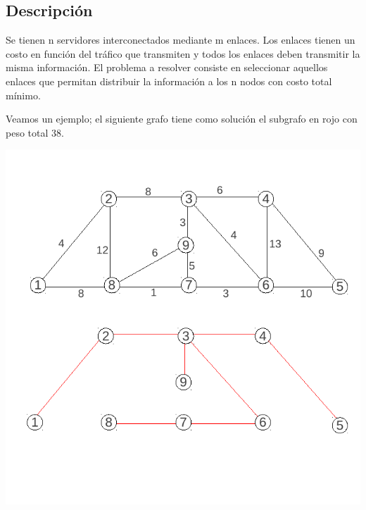 \subsection{Descripción}
Se tienen n servidores interconectados mediante m enlaces. Los enlaces tienen un costo en función del tráfico que transmiten y todos los enlaces deben transmitir la misma información. El problema a resolver consiste en seleccionar aquellos enlaces que permitan distribuir la información a los n nodos con costo total mínimo.


Veamos un ejemplo; el siguiente grafo tiene como solución el subgrafo en rojo con peso total 38.

\begin{center}
\includegraphics{ej2/1/Img1.pdf} 
\end{center}


